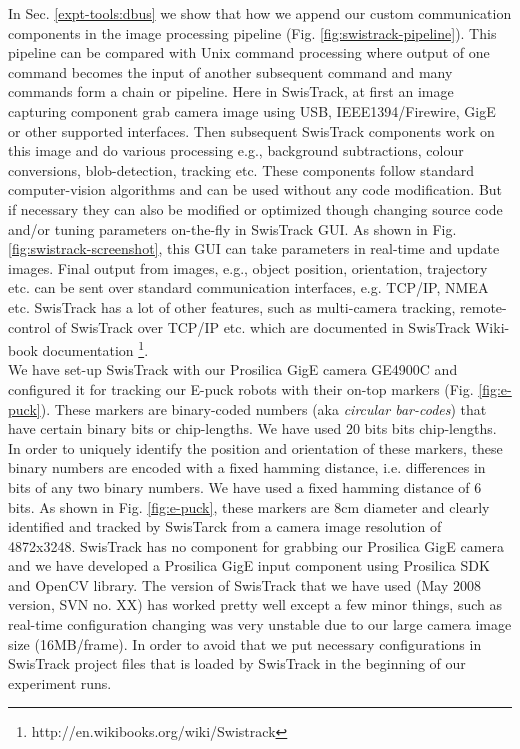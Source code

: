 In Sec. \ref{expt-tools:dbus} we show that how we append our custom communication components in the image processing pipeline (Fig. \ref{fig:swistrack-pipeline}). This pipeline can be compared with Unix command processing where output of one command becomes the input of another subsequent command and many commands form a chain or pipeline. Here in SwisTrack, at first an image capturing component grab camera image using USB, IEEE1394/Firewire, GigE or other supported interfaces. Then subsequent SwisTrack components work on this image and do various processing e.g., background subtractions, colour conversions, blob-detection, tracking etc. These components follow standard computer-vision algorithms and can be used without any code modification. But if necessary they can also be modified or optimized though changing source code and/or tuning parameters on-the-fly in SwisTrack GUI. As shown in Fig. \ref{fig:swistrack-screenshot}, this GUI can take parameters in real-time and update images. Final output from images, e.g., object position, orientation, trajectory etc. can be sent over standard communication interfaces, e.g. TCP/IP, NMEA etc. SwisTrack has a lot of other features, such as multi-camera tracking, remote-control of SwisTrack over TCP/IP etc. which are documented in SwisTrack Wiki-book documentation \footnote{http://en.wikibooks.org/wiki/Swistrack}.\\
We have set-up SwisTrack with our Prosilica GigE camera GE4900C and configured it for tracking our E-puck robots with their on-top markers (Fig. \ref{fig:e-puck}). These markers are binary-coded numbers (aka {\em circular bar-codes}) that have certain binary bits or chip-lengths. We have used 20 bits bits chip-lengths. In order to uniquely identify the position and orientation of these markers, these binary numbers are encoded with a fixed hamming distance, i.e. differences in bits of any two binary numbers. We have used a fixed hamming distance of 6 bits. As shown in Fig. \ref{fig:e-puck}, these markers are 8cm diameter and clearly identified and tracked by SwisTarck from a camera image resolution of 4872x3248. SwisTrack has no component for grabbing our Prosilica GigE camera and we have developed a Prosilica GigE input component using Prosilica SDK and OpenCV library. The version of SwisTrack that we have used (May 2008 version, SVN no. XX) has worked pretty well except a few minor things, such as real-time configuration changing was very unstable due to our large camera image size (16MB/frame). In order to avoid that we put necessary configurations in SwisTrack project files that is loaded by SwisTrack in the beginning of our experiment runs.\\

